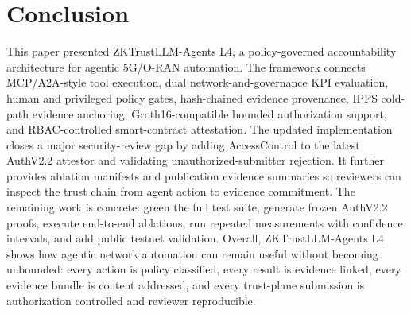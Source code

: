 \section{Conclusion}

This paper presented ZKTrustLLM-Agents L4, a policy-governed accountability architecture for agentic 5G/O-RAN automation. The framework connects MCP/A2A-style tool execution, dual network-and-governance KPI evaluation, human and privileged policy gates, hash-chained evidence provenance, IPFS cold-path evidence anchoring, Groth16-compatible bounded authorization support, and RBAC-controlled smart-contract attestation. The updated implementation closes a major security-review gap by adding AccessControl to the latest AuthV2.2 attestor and validating unauthorized-submitter rejection. It further provides ablation manifests and publication evidence summaries so reviewers can inspect the trust chain from agent action to evidence commitment. The remaining work is concrete: green the full test suite, generate frozen AuthV2.2 proofs, execute end-to-end ablations, run repeated measurements with confidence intervals, and add public testnet validation. Overall, ZKTrustLLM-Agents L4 shows how agentic network automation can remain useful without becoming unbounded: every action is policy classified, every result is evidence linked, every evidence bundle is content addressed, and every trust-plane submission is authorization controlled and reviewer reproducible.
